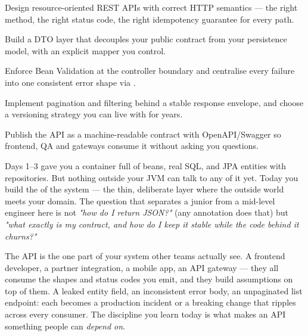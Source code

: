 
\begin{objectives}
\begin{wbitem}
  \item Design resource-oriented REST APIs with correct HTTP semantics --- the right method, the right status code, the right idempotency guarantee for every path.
  \item Build a DTO layer that decouples your public contract from your persistence model, with an explicit mapper you control.
  \item Enforce Bean Validation at the controller boundary and centralise every failure into one consistent error shape via .
  \item Implement pagination and filtering behind a stable response envelope, and choose a versioning strategy you can live with for years.
  \item Publish the API as a machine-readable contract with OpenAPI/Swagger so frontend, QA and gateways consume it without asking you questions.
\end{wbitem}
\end{objectives}


 Days 1--3 gave you a container full of beans, real SQL, and JPA entities with repositories. But nothing outside your JVM can talk to any of it yet. Today you build the  of the system --- the thin, deliberate layer where the outside world meets your domain. The question that separates a junior from a mid-level engineer here is not \emph{"how do I return JSON?"} (any annotation does that) but \emph{"what exactly is my contract, and how do I keep it stable while the code behind it churns?"}

 The API is the one part of your system other teams actually see. A frontend developer, a partner integration, a mobile app, an API gateway --- they all consume the shapes and status codes you emit, and they build assumptions on top of them. A leaked entity field, an inconsistent error body, an unpaginated list endpoint: each becomes a production incident or a breaking change that ripples across every consumer. The discipline you learn today is what makes an API something people can \emph{depend on}.

